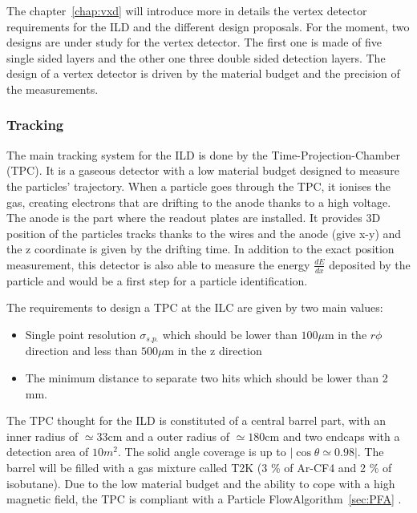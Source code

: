       The chapter~\ref{chap:vxd} will introduce more in details the vertex detector requirements for the \gls{ILD} and the different design proposals. 
      For the moment, two designs are under study for the vertex detector.
      The first one is made of five single sided layers and the other one three double sided detection layers.
      The design of a vertex detector is driven by the material budget and the precision of the measurements.

      \subsubsection{Tracking}

      The main tracking system for the \gls{ILD} is done by the Time-Projection-Chamber (TPC).
      It is a gaseous detector with a low material budget designed to measure the particles' trajectory.
      When a particle goes through the TPC, it ionises the gas, creating electrons that are drifting to the anode thanks to a high voltage.
      The anode is the part where the readout plates are installed.
      It provides 3D position of the particles tracks thanks to the wires and the anode (give x-y) and the z coordinate is given by the drifting time.
      In addition to the exact position measurement, this detector is also able to measure the energy $\frac{dE}{dx}$ deposited by the particle and would be a first step for a particle identification.

      The requirements to design a TPC at the ILC are given by two main values: 
      
      \begin{itemize} 
        \item Single point resolution $\sigma_{s.p.}$ which should be lower than $100 \mu\text{m}$ in the $r\phi$ direction and less than $500 \mu\text{m}$ in the z direction
        \item The minimum distance to separate two hits which should be lower than 2 mm.
      \end{itemize}

      The TPC thought for the \gls{ILD} is constituted of a central barrel part, with an inner radius of $\simeq 33 \text{cm}$ and a outer radius of $\simeq 180 \text{cm}$ and two endcaps with a detection area of $10 m^2$. 
      The solid angle coverage is up to $|\cos{\theta} \simeq 0.98|$.
      The barrel will be filled with a gas mixture called T2K (3 \% of Ar-CF4 and 2 \% of isobutane).
      Due to the low material budget and the ability to cope with a high magnetic field, the TPC is compliant with a Particle FlowAlgorithm~\ref{sec:PFA} . 


